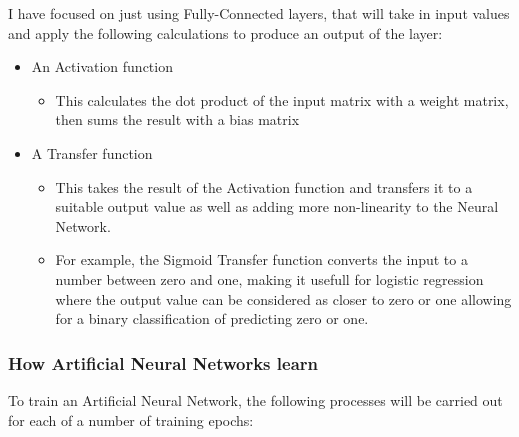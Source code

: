 \documentclass[./project-report/src/latex/project-report.tex]{subfiles}
\begin{document}
I have focused on just using Fully-Connected layers, that will take in input values and apply the following calculations to produce an output of the layer:

\begin{itemize}
    \item An Activation function
    \begin{itemize}
        \item This calculates the dot product of the input matrix with a weight matrix, then sums the result with a bias matrix
    \end{itemize}
    \item A Transfer function
    \begin{itemize}
        \item This takes the result of the Activation function and transfers it to a suitable output value as well as adding more non-linearity to the Neural Network.
        \item For example, the Sigmoid Transfer function converts the input to a number between zero and one, making it usefull for logistic regression where the output 
              value can be considered as closer to zero or one allowing for a binary classification of predicting zero or one.
    \end{itemize}
\end{itemize}
\vspace{5mm}

\subsubsection{How Artificial Neural Networks learn}
\vspace{5mm}

To train an Artificial Neural Network, the following processes will be carried out for each of a number of training epochs:
\end{document}
